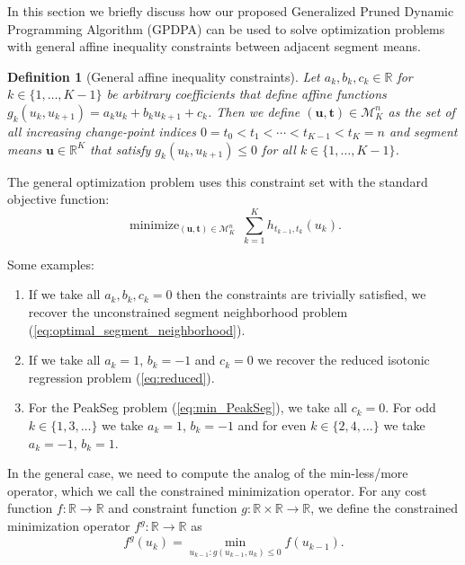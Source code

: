 \documentclass{article}
\newtheorem{definition}{Definition}
\DeclareMathOperator*{\minimize}{minimize}
\newcommand{\RR}{\mathbb R}
\begin{document}
In this section we briefly discuss how our proposed Generalized Pruned
Dynamic Programming Algorithm (GPDPA) can be used to solve
optimization problems with general affine inequality constraints
between adjacent segment means.

\begin{definition}[General affine inequality constraints]
\label{def:affine-inequality-constraints}
  Let $a_k,b_k,c_k\in\RR$ for $k\in\{1,\dots,K-1\}$ be arbitrary
  coefficients that define affine functions
  $g_k(u_k, u_{k+1})=a_k u_k + b_k u_{k+1} + c_k$. Then we define
  $(\mathbf u, \mathbf t)\in\mathcal M^n_K$ as the set of all
  increasing change-point indices $0=t_0<t_1<\cdots<t_{K-1}<t_K=n$ and
  segment means $\mathbf u\in\RR^K$ that satisfy
  $g_k(u_k, u_{k+1}) \leq 0$ for all $k\in\{1,\dots, K-1\}$.
\end{definition}
The general optimization problem uses this constraint set with the
standard objective function:
\begin{equation}
  \label{eq:min_general_affine_inequality}
    \minimize_{
        (\mathbf u, \mathbf t)\in\mathcal M^n_K
      } \ 
\sum_{k=1}^K h_{t_{k-1}, t_k}(u_k).
\end{equation}

Some examples:
\begin{enumerate}
\item If we take all $a_k,b_k,c_k=0$ then the constraints are
  trivially satisfied, we
  recover the unconstrained segment neighborhood problem
  (\ref{eq:optimal_segment_neighborhood}).
\item If we take all $a_{k} =1$, $b_{k}=-1$ and $c_{k} = 0$ we recover
  the reduced isotonic regression problem
  (\ref{eq:reduced}).
\item For the PeakSeg problem (\ref{eq:min_PeakSeg}),
  we take all $c_{k} = 0$. For odd $k\in\{1,3,\dots\}$ we take
  $a_{k} =1$, $b_{k}=-1$ and for even $k\in\{2,4,\dots\}$ we take
  $a_{k} =-1$, $b_{k}=1$.
\end{enumerate}

In the general case, we need to compute the analog of the
min-less/more operator, which we call the constrained minimization
operator. For any cost function $f:\RR\rightarrow\RR$ and constraint
function $g:\RR\times\RR\rightarrow\RR$, we define the constrained
minimization operator $f^g:\RR\rightarrow\RR$ as
\begin{equation}
  \label{eq:constrained-min-operator}
  f^g(u_{k}) = \min_{u_{k-1} : g(u_{k-1}, u_{k})\leq 0} f(u_{k-1}).
\end{equation}
\end{document}
